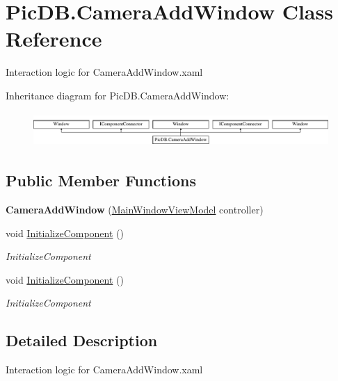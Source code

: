 \hypertarget{class_pic_d_b_1_1_camera_add_window}{}\section{Pic\+D\+B.\+Camera\+Add\+Window Class Reference}
\label{class_pic_d_b_1_1_camera_add_window}


Interaction logic for Camera\+Add\+Window.\+xaml  


Inheritance diagram for Pic\+D\+B.\+Camera\+Add\+Window\+:\begin{figure}[H]
\begin{center}
\leavevmode
\includegraphics[height=1.317647cm]{class_pic_d_b_1_1_camera_add_window}
\end{center}
\end{figure}
\subsection*{Public Member Functions}
\begin{DoxyCompactItemize}
\item 
\mbox{\label{class_pic_d_b_1_1_camera_add_window_ace6208321cbab35882ee466e5d73a40a}} 
{\bfseries Camera\+Add\+Window} (\mbox{\hyperlink{class_pic_d_b_1_1_view_models_1_1_main_window_view_model}{Main\+Window\+View\+Model}} controller)
\item 
void \mbox{\hyperlink{class_pic_d_b_1_1_camera_add_window_abb17f3480dce6c490f858d9f5e65ec8b}{Initialize\+Component}} ()
\begin{DoxyCompactList}\small\item\em Initialize\+Component \end{DoxyCompactList}\item 
void \mbox{\hyperlink{class_pic_d_b_1_1_camera_add_window_abb17f3480dce6c490f858d9f5e65ec8b}{Initialize\+Component}} ()
\begin{DoxyCompactList}\small\item\em Initialize\+Component \end{DoxyCompactList}\end{DoxyCompactItemize}


\subsection{Detailed Description}
Interaction logic for Camera\+Add\+Window.\+xaml 

